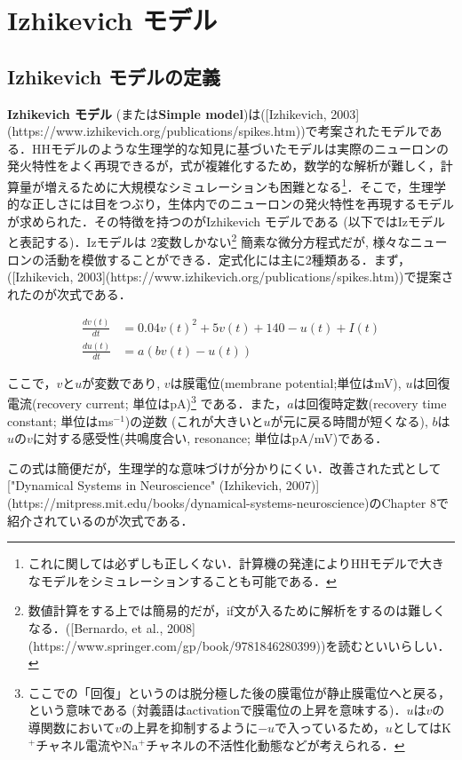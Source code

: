 \section{Izhikevich モデル}
\subsection{Izhikevich モデルの定義}
\textbf{Izhikevich モデル} (または\textbf{Simple model})は([Izhikevich, 2003](https://www.izhikevich.org/publications/spikes.htm))で考案されたモデルである．HHモデルのような生理学的な知見に基づいたモデルは実際のニューロンの発火特性をよく再現できるが，式が複雑化するため，数学的な解析が難しく，計算量が増えるために大規模なシミュレーションも困難となる\footnote{これに関しては必ずしも正しくない．計算機の発達によりHHモデルで大きなモデルをシミュレーションすることも可能である．}．そこで，生理学的な正しさには目をつぶり，生体内でのニューロンの発火特性を再現するモデルが求められた．その特徴を持つのがIzhikevich モデルである (以下ではIzモデルと表記する)．Izモデルは 2変数しかない\footnote{数値計算をする上では簡易的だが，if文が入るために解析をするのは難しくなる．([Bernardo, et al., 2008](https://www.springer.com/gp/book/9781846280399))を読むといいらしい．}
簡素な微分方程式だが, 様々なニューロンの活動を模倣することができる．定式化には主に2種類ある．まず，([Izhikevich, 2003](https://www.izhikevich.org/publications/spikes.htm))で提案されたのが次式である．


\begin{align}
\frac{dv(t)}{dt}&=0.04v(t)^2 + 5v(t)+140-u(t)+I(t) \\
\frac{du(t)}{dt}&=a(bv(t)-u(t))
\end{align} 


ここで，$v$と$u$が変数であり, $v$は膜電位(membrane potential;単位はmV), $u$は回復電流(recovery current; 単位はpA)\footnote{ここでの「回復」というのは脱分極した後の膜電位が静止膜電位へと戻る，という意味である (対義語はactivationで膜電位の上昇を意味する)．$u$は$v$の導関数において$v$の上昇を抑制するように$-u$で入っているため，$u$としてはK$^+$チャネル電流やNa$^+$チャネルの不活性化動態などが考えられる．}
である．また，$a$は回復時定数(recovery time constant; 単位はms$^{-1}$)の逆数 (これが大きいと$u$が元に戻る時間が短くなる), $b$は$u$の$v$に対する感受性(共鳴度合い,  resonance; 単位はpA/mV)である．

この式は簡便だが，生理学的な意味づけが分かりにくい．改善された式として["Dynamical Systems in Neuroscience" (Izhikevich, 2007)](https://mitpress.mit.edu/books/dynamical-systems-neuroscience)のChapter 8で紹介されているのが次式である．


